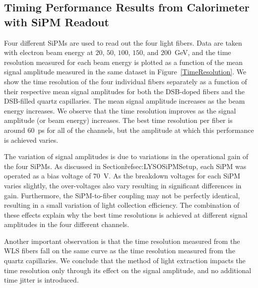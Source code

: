 \subsection{Timing Performance Results from Calorimeter with SiPM Readout}
\label{sec:beamtiming}

Four different SiPMs are used to read out the four light fibers. Data are taken with electron
beam energy at $20$, $50$, $100$, $150$, and $200$~GeV, and the time resolution
measured for each beam energy is plotted as a function of the mean signal
amplitude measured in the same dataset in Figure~\ref{TimeResolution}. We show
the time resolution of the four individual fibers separately as a function of their
respective mean signal amplitudes for both the DSB-doped fibers and the DSB-filled
quartz capillaries. The mean signal amplitude increases as the beam energy 
increases. We observe that the time resolution improves as the 
signal amplitude (or beam energy) increases. The best time resolution per fiber is around
$60$~ps for all of the channels, but the amplitude at which this performance is
achieved varies. 

The variation of signal amplitudes is due to variations in the operational gain
of the four SiPMs. As discussed in Section\~ref{sec:LYSOSiPMSetup}, each SiPM
was operated as a bias voltage of $70$~V. As the breakdown voltages for each
SiPM varies slightly, the over-voltages also vary resulting in significant
differences in gain. Furthermore, the SiPM-to-fiber coupling may not be perfectly
identical, resulting in a small variation of light collection efficiency. The combination of these effects
explain why the best time resolutions is achieved at different signal amplitudes in the four
different channels.

Another important observation is that the time resolution
measured from the WLS fibers fall on the same curve as the time
resolution measured from the quartz capillaries. We conclude that the method of
light extraction impacts the time resolution only through its effect on the
signal amplitude, and no additional time jitter is introduced. 



